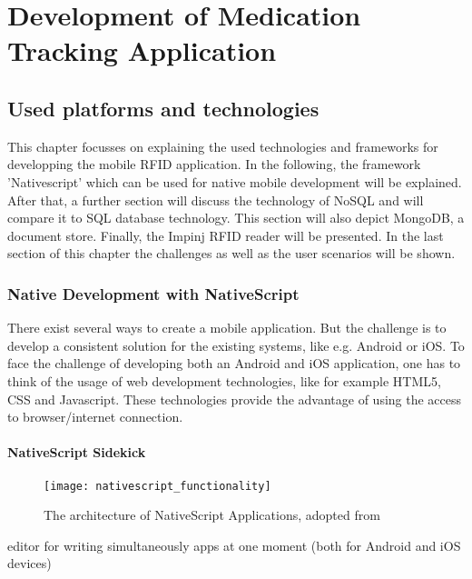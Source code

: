 \chapter{Development of Medication Tracking Application}
\label{Kap3}

\section{Used platforms and technologies} \label{platforms}

This chapter focusses on explaining the used technologies and frameworks for developping the mobile RFID application. In the following, the framework 'Nativescript' which can be used for native mobile development will be explained. After that, a further section will discuss the technology of NoSQL and will compare it to SQL database technology. This section will also depict MongoDB, a document store. Finally, the Impinj RFID reader will be presented. In the last section \pageref{app_development} of this chapter the challenges as well as the user scenarios will be shown. 

\subsection{Native Development with NativeScript} 

There exist several ways to create a mobile application. But the challenge is to develop a consistent solution for the existing systems, like e.g. Android or iOS.
To face the challenge of developing both an Android and iOS application, one has to think of the usage of web development technologies, like for example HTML5, CSS and Javascript. These technologies provide the advantage of using the access to browser/internet  connection.

\subsubsection{NativeScript Sidekick}

\begin{figure}
\centering
\texttt{[image: nativescript\_functionality]} 
\caption{\label{fig:nsarchitecture}The architecture of NativeScript Applications, adopted from \cite{nsarchitecture}} 
\end{figure}

editor for writing simultaneously apps at one moment (both for Android and iOS devices)

